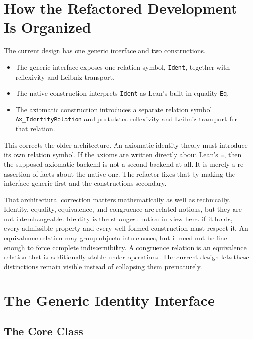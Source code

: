 \documentclass[11pt]{article}
\newcommand{\leaninline}[1]{\texttt{#1}}
\begin{document}
\section{How the Refactored Development Is Organized}

The current design has one generic interface and two constructions.

\begin{itemize}[leftmargin=1.5em]
\item The generic interface exposes one relation symbol, \leaninline{Ident}, together with reflexivity and Leibniz transport.
\item The native construction interprets \leaninline{Ident} as Lean's built-in equality \leaninline{Eq}.
\item The axiomatic construction introduces a separate relation symbol \leaninline{Ax\_IdentityRelation} and postulates reflexivity and Leibniz transport for that relation.
\end{itemize}

This corrects the older architecture. An axiomatic identity theory must introduce its own relation symbol. If the axioms are written directly about Lean's \leaninline{=}, then the supposed axiomatic backend is not a second backend at all. It is merely a re-assertion of facts about the native one. The refactor fixes that by making the interface generic first and the constructions secondary.

That architectural correction matters mathematically as well as technically. Identity, equality, equivalence, and congruence are related notions, but they are not interchangeable. Identity is the strongest notion in view here: if it holds, every admissible property and every well-formed construction must respect it. An equivalence relation may group objects into classes, but it need not be fine enough to force complete indiscernibility. A congruence relation is an equivalence relation that is additionally stable under operations. The current design lets these distinctions remain visible instead of collapsing them prematurely.

\section{The Generic Identity Interface}

\subsection{The Core Class}
\end{document}
